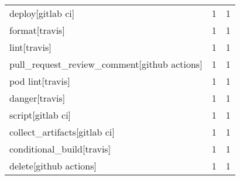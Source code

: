 \begin{tabular}{lrr}
deploy[gitlab ci]                           &                   1 &             1 \\
format[travis]                              &                   1 &             1 \\
lint[travis]                                &                   1 &             1 \\
pull\_request\_review\_comment[github actions] &                   1 &             1 \\
pod lint[travis]                            &                   1 &             1 \\
danger[travis]                              &                   1 &             1 \\
script[gitlab ci]                           &                   1 &             1 \\
collect\_artifacts[gitlab ci]                &                   1 &             1 \\
conditional\_build[travis]                   &                   1 &             1 \\
delete[github actions]                      &                   1 &             1 \\
\bottomrule
\end{tabular}
